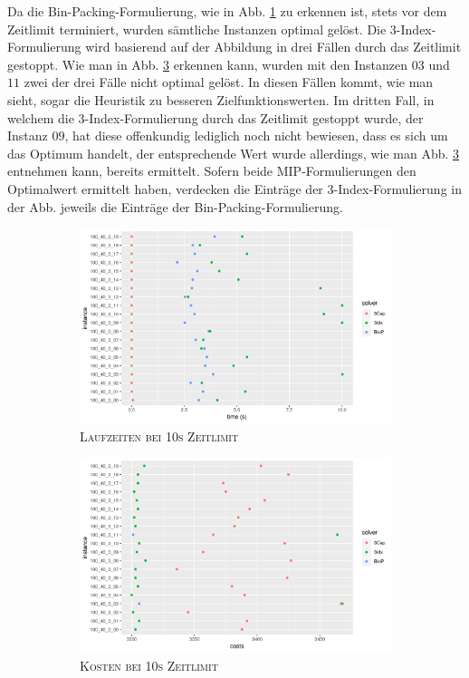 Da die Bin-Packing-Formulierung, wie in Abb. \ref{fig:b=3_s_runtimes} zu erkennen ist, stets vor dem Zeitlimit terminiert,
wurden sämtliche Instanzen optimal gelöst. Die 3-Index-Formulierung wird basierend auf der Abbildung in drei Fällen
durch das Zeitlimit gestoppt. Wie man in Abb. \ref{fig:b=3_s_costs} erkennen kann, wurden mit den Instanzen $03$ und $11$
zwei der drei Fälle nicht optimal gelöst. In diesen Fällen kommt, wie man sieht, sogar die Heuristik zu besseren Zielfunktionswerten.
Im dritten Fall, in welchem die 3-Index-Formulierung durch das Zeitlimit gestoppt wurde, der Instanz $09$, hat diese
offenkundig lediglich noch nicht bewiesen, dass es sich um das Optimum handelt, der entsprechende Wert wurde allerdings,
wie man Abb. \ref{fig:b=3_s_costs} entnehmen kann, bereits ermittelt. Sofern beide MIP-Formulierungen den Optimalwert ermittelt haben,
verdecken die Einträge der 3-Index-Formulierung in der Abb. jeweils die Einträge der Bin-Packing-Formulierung.

\begin{figure}[H]
\centering
\begin{subfigure}[b]{0.4\textwidth}
\centering
\includegraphics[width=1.3\textwidth]{img/solver_instance_time_b=3_s_10s.png}
\caption{\textsc{Laufzeiten bei 10s Zeitlimit}}
\label{fig:b=3_s_runtimes}
\end{subfigure}
\hfill
\begin{subfigure}[b]{0.4\textwidth}
\centering
\includegraphics[width=1.3\textwidth]{img/solver_instance_cost_b=3_s_10s.png}
\caption{\textsc{Kosten bei 10s Zeitlimit}}
\label{fig:b=3_s_costs}
\end{subfigure}
\caption{}
\end{figure}


